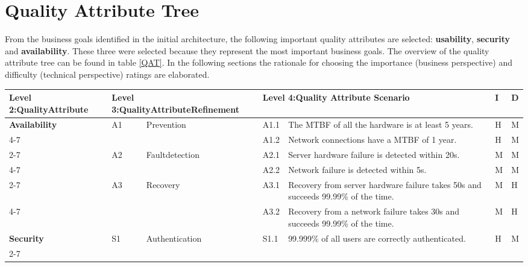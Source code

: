 \documentclass[a4paper,11pt]{report}
\begin{document}
\section{Quality Attribute Tree}
From the business goals identified in the initial architecture, the following important quality attributes are 
selected:  \textbf{usability}, \textbf{security} and \textbf{availability}. These three were selected because
they represent the most important business goals. The overview of the quality attribute 
tree can be found in table \ref{QAT}. In the following sections the rationale for choosing the importance 
(business perspective) and difficulty (technical perspective) ratings are elaborated.
\begin{table}[htpb]
\begin{center}
\begin{tabular}{| p{} | p{0.25cm}  p{2.5cm} | p{0.55cm}  p{7cm} | p{} | p{} | }
\hline
\textbf{Level 2:\newline Quality\newline Attribute} & \multicolumn{2}{p{2.75cm}|}{\textbf{Level 3:\newline Quality\newline Attribute\newline Refinement}} & \multicolumn{2}{p{6.65cm}|}{\textbf{Level 4:\newline Quality Attribute Scenario}} & \textbf{I} & \textbf{D}\\
\hline
\hline
\textbf{Availability} 	& A1 & Prevention 	& A1.1 & The MTBF of all the hardware is at least 5 years. & H & M   \\\cline{4-7}
			& &			& A1.2 & Network connections have a MTBF of 1 year.  & H & M  \\\cline{2-7}
			& A2 & Fault\newline detection 	& A2.1 & Server hardware failure is detected within 20s. & M & M  \\\cline{4-7}
			& &			& A2.2 & Network failure is detected within 5s. & M & M  \\\cline{2-7}
			& A3 & Recovery 	& A3.1 & Recovery from server hardware failure takes 50s and succeeds 99.99\% of the time. & M & H  \\\cline{4-7}
			& &			& A3.2 & Recovery from a network failure takes 30s and succeeds 99.99\% of the time. & M & H  \\\hline
\textbf{Security} 	& S1 & Authentication 	& S1.1 & 99.999\% of all users are correctly authenticated. & H & M   \\\cline{2-7}

\end{tabular}
\end{center}
\end{table}
\end{document}
